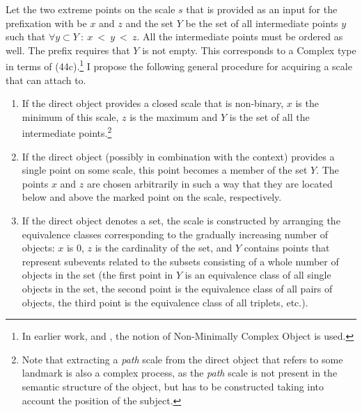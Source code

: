 Let the two extreme points on the scale $s$ that is provided as an input for the prefixation with  be $x$ and $z$ and the set $Y$ be the set of all intermediate points $y$ such that $\forall y \subset Y~:~x~<~y~<~z$. All the intermediate points must be ordered as well. The prefix requires that $Y$ is not empty. This corresponds to a Complex type in terms of \citealt{Beavers:12} (44c).\footnote{In earlier work, \citealt{Beavers:02} and \citealt{Beavers:08}, the notion of Non-Minimally Complex Object is used.} I propose the following general procedure for acquiring a scale that  can attach to. 
\begin{enumerate}
\item If the direct object provides a closed scale that is non-binary, $x$ is the minimum of this scale, $z$ is the maximum and $Y$ is the set of all the intermediate points.\footnote{Note that extracting a \textit{path} scale from the direct object that refers to some landmark is also a complex process, as the \textit{path} scale is not present in the semantic structure of the object, but has to be constructed taking into account the position of the subject.}
\item If the direct object (possibly in combination with the context) provides a single point on some scale, this point becomes a member of the set $Y$. The points $x$ and $z$ are chosen arbitrarily in such a way that they are located below and above the marked point on the scale, respectively. 
\item If the direct object denotes a set, the scale is constructed by arranging the equivalence classes corresponding to the gradually increasing number of objects: $x$ is 0, $z$ is the cardinality of the set, and $Y$ contains points that represent subevents related to the subsets consisting of a whole number of objects in the set (the first point in $Y$ is an equivalence class of all single objects in the set, the second point is the equivalence class of all pairs of objects, the third point is the equivalence class of all triplets, etc.).
\end{enumerate}

